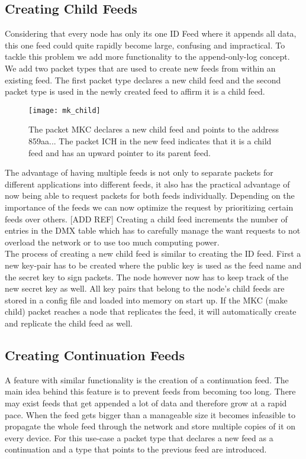 \subsection{Creating Child Feeds}
Considering that every node has only its one ID Feed where it appends all data, this one feed could quite rapidly become large, confusing and impractical. To tackle this problem we add more functionality to the append-only-log concept. We add two packet types that are used to create new feeds from within an existing feed. The first packet type declares a new child feed and the second packet type is used in the newly created feed to affirm it is a child feed.

\begin{figure}
\centering
\texttt{[image: mk\_child]}
\caption{The packet MKC declares a new child feed and points to the address 859aa... The packet ICH in the new feed indicates that it is a child feed and has an upward pointer to its parent feed.}
\label{fig:mk_child}
\end{figure}

The advantage of having multiple feeds is not only to separate packets for different applications into different feeds, it also has the practical advantage of now being able to request packets for both feeds individually. Depending on the importance of the feeds we can now optimize the request by prioritizing certain feeds over others. [ADD REF] Creating a child feed increments the number of entries in the DMX table which has to carefully manage the want requests to not overload the network or to use too much computing power. \\
The process of creating a new child feed is similar to creating the ID feed. First a new key-pair has to be created where the public key is used as the feed name and the secret key to sign packets. The node however now has to keep track of the new secret key as well. All key pairs that belong to the node's child feeds are stored in a config file and loaded into memory on start up. If the MKC (make child) packet reaches a node that replicates the feed, it will automatically create and replicate the child feed as well.

\subsection{Creating Continuation Feeds}
A feature with similar functionality is the creation of a continuation feed. The main idea behind this feature is to prevent feeds from becoming too long. There may exist feeds that get appended a lot of data and therefore grow at a rapid pace. When the feed gets bigger than a manageable size it becomes infeasible to propagate the whole feed through the network and store multiple copies of it on every device. For this use-case a packet type that declares a new feed as a continuation and a type that points to the previous feed are introduced.

